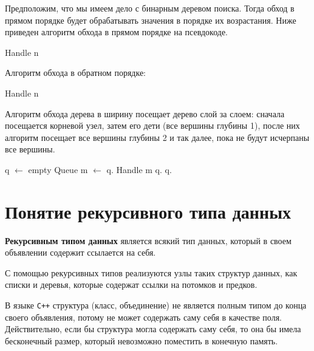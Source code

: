 Предположим, что мы имеем дело с бинарным деревом поиска. Тогда обход в прямом порядке будет обрабатывать значения
в порядке их возрастания. Ниже приведен алгоритм обхода в прямом порядке на псевдокоде.
\begin{algorithmic}[1]
    \State Handle n
      \State {}
    \EndIf

      \State {}
    \EndIf
  \EndFunction
\end{algorithmic}

Алгоритм обхода в обратном порядке:
\begin{algorithmic}[1]
      \State {}
    \EndIf
      \State {}
    \EndIf
    \State Handle n
  \EndFunction
\end{algorithmic}


Алгоритм обхода дерева в ширину посещает дерево слой за слоем: сначала посещается корневой узел,
затем его дети (все вершины глубины 1), после них алгоритм посещает все вершины глубины 2 и так
далее, пока не будут исчерпаны все вершины.
\begin{algorithmic}[1]
    \State q $\gets$ empty Queue
    \State {}
      \State m $\gets$ q.
      \State Handle m
        \State q.
      \EndIf
        \State q.
      \EndIf
    \EndWhile
  \EndFunction
\end{algorithmic}

\section{Понятие рекурсивного типа данных}
\textbf{Рекурсивным типом данных} является всякий тип данных, который в своем объявлении содержит ссылается
на себя.

С помощью рекурсивных типов реализуются узлы таких структур данных, как списки и деревья, которые
содержат ссылки на потомков и предков.

В языке \verb|C++| структура (класс, объединение) не является полным типом до конца
своего объявления, потому не может содержать саму себя в качестве поля. Действительно, если бы структура
могла содержать саму себя, то она бы имела бесконечный размер, который невозможно поместить в конечную память.

